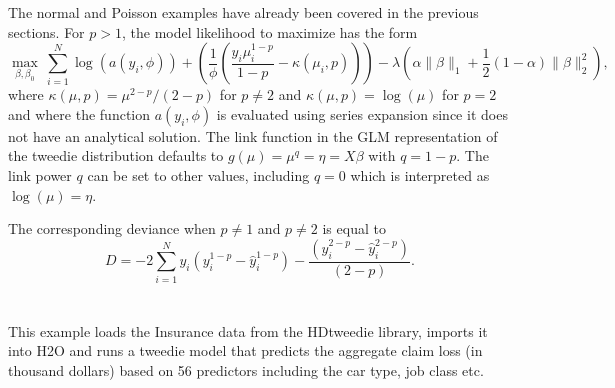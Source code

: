 The normal and Poisson examples have already been covered in the previous sections. For $p>1$, the model likelihood to maximize has the form
$$  \max_{\beta,\beta_0} \ \sum_{i=1}^N \log(a(y_i,\phi)) + \left( \frac{1}{\phi}\left( \frac{y_i\mu_i^{1-p}}{1-p} - \kappa(\mu_i,p) \right)  \right) -\lambda  \left(  \alpha \| \beta \|_1 + \frac{1}{2}(1-\alpha)\| \beta \|_2^2  \right), $$
where $\kappa(\mu,p) = \mu^{2-p}/(2-p)$ for $p \neq 2$ and $\kappa(\mu,p) = \log(\mu)$ for $p=2$ and where the function $a(y_i,\phi)$ is evaluated using series expansion since it does not have an analytical solution. The link function in the GLM representation of the tweedie distribution defaults to $g(\mu) = \mu^{q} = \eta = X\beta$ with $q=1-p$. The link power $q$ can be set to other values, including $q=0$ which is interpreted as $\log(\mu)=\eta$. 
%

The corresponding deviance when $p \neq 1$ and $p\neq 2$ is equal to
$$D = -2 \sum_{i=1}^{N} y_i  (y_i^{1-p} - \hat{y}_i^{1-p} ) - \frac{(y_i^{2 - p} - \hat{y}_i^{2 - p})}{(2 - p)}. $$\\

\waterExampleInR
\\
This example loads the Insurance data from the HDtweedie library, imports it into H2O and runs a tweedie model that predicts the aggregate claim loss (in thousand dollars) based on 56 predictors including the car type, job class etc.



%


